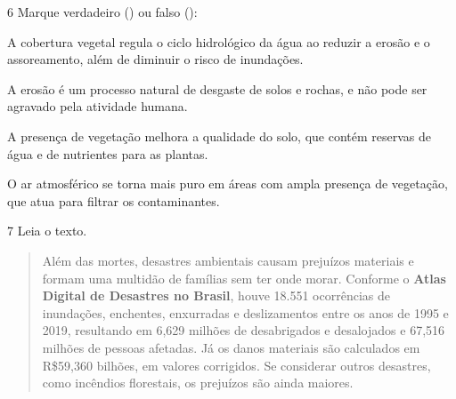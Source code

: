 \num{6} Marque verdadeiro () ou falso ():

\begin{boxlist}
\item A cobertura vegetal regula o ciclo hidrológico da água ao reduzir 
a erosão e o assoreamento, além de diminuir o risco de inundações. 

\item A erosão é um processo natural de desgaste de solos e rochas, e 
não pode ser agravado pela atividade humana. 

\item A presença de vegetação melhora a qualidade do solo, que contém 
reservas de água e de nutrientes para as plantas. 

\item O ar atmosférico se torna mais puro em áreas com ampla presença de 
vegetação, que atua para filtrar os contaminantes. 
\end{boxlist}


\num{7} Leia o texto.

\begin{quote}
Além das mortes, desastres ambientais causam prejuízos materiais e
formam uma multidão de famílias sem ter onde morar. Conforme o
\textbf{Atlas Digital de Desastres no Brasil}, houve 18.551 ocorrências
de inundações, enchentes, enxurradas e deslizamentos entre os anos de
1995 e 2019, resultando em 6,629 milhões de desabrigados e desalojados e
67,516 milhões de pessoas afetadas. Já os danos materiais são calculados
em R\$59,360 bilhões, em valores corrigidos. Se considerar outros
desastres, como incêndios florestais, os prejuízos são ainda maiores.

\end{quote}

